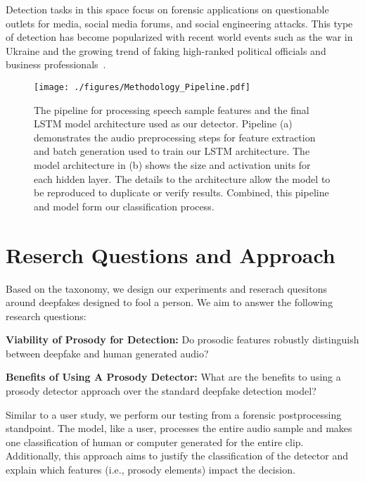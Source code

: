 \documentclass[10pt, journal, anonymous=true]{IEEEtran}
\begin{document}
Detection tasks in this space focus on forensic applications on questionable outlets for media, social 
media forums, and social engineering attacks. This type of detection has become popularized 
with recent world events such as the war in Ukraine and the growing trend of faking high-ranked political 
officials and business professionals~\cite{ukraine_deepfake}.

\begin{figure*}[!t]
    \begin{center}
        \texttt{[image: ./figures/Methodology\_Pipeline.pdf]}
        \vspace{-0.3cm}
        \caption{ The pipeline for processing speech sample features and the final LSTM model architecture used as our detector.
        Pipeline (a) demonstrates the audio preprocessing steps for feature extraction and batch generation used to train our LSTM architecture.
        The model architecture in (b) shows the size and activation units for each hidden layer. The details to the architecture
        allow the model to be reproduced to duplicate or verify results. Combined, this pipeline and
        model form our classification process.
        } 
        \label{fig:training_pipeline}
    \end{center}  
\end{figure*}
\section{Reserch Questions and Approach} 
\label{sec:rqs} 

Based on the taxonomy, we design our experiments and reserach quesitons around deepfakes designed to fool a person. We aim to answer the following research questions:

\begin{rqs}

    \item \textbf{Viability of Prosody for Detection:} Do prosodic features robustly distinguish between deepfake and human generated audio?
    
    \hfill
    \item \textbf{Benefits of Using A Prosody Detector:} What are the benefits to using a prosody detector approach over the standard deepfake detection model?
    
\end{rqs}

Similar to a user study, we perform our testing from a forensic postprocessing standpoint. The model, like a user, processes the entire audio sample and makes one classification of human or computer generated for the entire clip. Additionally, this approach aims to justify the classification of the detector and explain which features (i.e., prosody elements) impact the decision. 
\end{document}
